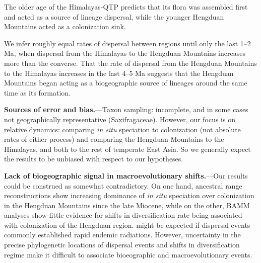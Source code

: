 The older age of the Himalayas-QTP predicts that its flora was assembled first and acted as a source of lineage dispersal, while the younger Hengduan Mountains acted as a colonization sink.


We infer roughly equal rates of dispersal between regions until only the last 1--2 Ma, when dispersal from the Himalayas to the Hengduan Mountains increases more than the converse. That the rate of dispersal from the Hengduan Mountains to the Himalayas increases in the last 4--5 Ma suggests that the Hengduan Mountains began acting as a biogeographic source of lineages around the same time as its formation. 


\textbf{Sources of error and bias.}---Taxon sampling: incomplete, and in some cases not geographically representative (Saxifragaceae). However, our focus is on relative dynamics: comparing \textit{in situ} speciation to colonization (not absolute rates of either process) and comparing the Hengduan Mountains to the Himalayas, and both to the rest of temperate East Asia. So we generally expect the results to be unbiased with respect to our hypotheses.

\textbf{Lack of biogeographic signal in macroevolutionary shifts.}---Our results could be construed as somewhat contradictory. On one hand, ancestral range reconstructions show increasing dominance of \textit{in situ} speciation over colonization in the Hengduan Mountains since the late Miocene, while on the other, BAMM analyses show little evidence for shifts in diversification rate being associated with colonization of the Hengduan region.  might be expected if dispersal events commonly established rapid endemic radiations. However, uncertainty in the precise phylogenetic locations of dispersal events and shifts in diversification regime make it difficult to associate bioeographic and macroevolutionary events.

